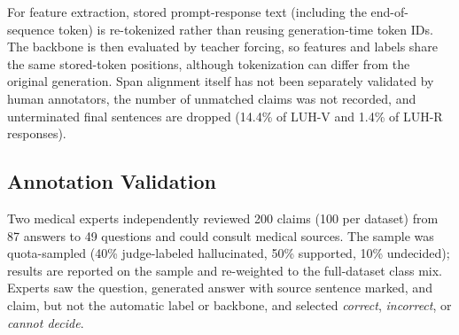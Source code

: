 \documentclass[conference,a4paper]{IEEEtran}
\begin{document}
\begin{table}[ht]

\centering

\small

\caption{Claim-to-token alignment statistics of the two datasets.}

\label{tab:align}


\end{table}

For feature extraction, stored prompt-response text (including the end-of-sequence token) is re-tokenized rather than reusing generation-time token IDs. The backbone is then evaluated by teacher forcing, so features and labels share the same stored-token positions, although tokenization can differ from the original generation. Span alignment itself has not been separately validated by human annotators, the number of unmatched claims was not recorded, and unterminated final sentences are dropped (14.4\% of LUH-V and 1.4\% of LUH-R responses).

\subsection{Annotation Validation}
\label{sec:annval}
Two medical experts independently reviewed 200 claims (100 per dataset) from 87 answers to 49 questions and could consult medical sources. The sample was quota-sampled (40\% judge-labeled hallucinated, 50\% supported, 10\% undecided); results are reported on the sample and re-weighted to the full-dataset class mix. Experts saw the question, generated answer with source sentence marked, and claim, but not the automatic label or backbone, and selected \emph{correct}, \emph{incorrect}, or \emph{cannot decide}.
\end{document}
